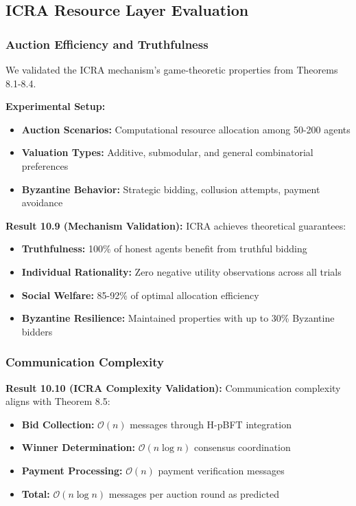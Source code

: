 \documentclass[conference]{IEEEtran}
\newcommand{\bigO}{\mathcal{O}}
\begin{document}
\subsection{ICRA Resource Layer Evaluation}

\subsubsection{Auction Efficiency and Truthfulness}

We validated the ICRA mechanism's game-theoretic properties from Theorems 8.1-8.4.

\textbf{Experimental Setup:}
\begin{itemize}
    \item \textbf{Auction Scenarios:} Computational resource allocation among 50-200 agents
    \item \textbf{Valuation Types:} Additive, submodular, and general combinatorial preferences
    \item \textbf{Byzantine Behavior:} Strategic bidding, collusion attempts, payment avoidance
\end{itemize}

\textbf{Result 10.9 (Mechanism Validation):} ICRA achieves theoretical guarantees:

\begin{itemize}
    \item \textbf{Truthfulness:} 100\% of honest agents benefit from truthful bidding
    \item \textbf{Individual Rationality:} Zero negative utility observations across all trials
    \item \textbf{Social Welfare:} 85-92\% of optimal allocation efficiency
    \item \textbf{Byzantine Resilience:} Maintained properties with up to 30\% Byzantine bidders
\end{itemize}

\subsubsection{Communication Complexity}

\textbf{Result 10.10 (ICRA Complexity Validation):} Communication complexity aligns with Theorem 8.5:

\begin{itemize}
    \item \textbf{Bid Collection:} $\bigO(n)$ messages through H-pBFT integration
    \item \textbf{Winner Determination:} $\bigO(n \log n)$ consensus coordination
    \item \textbf{Payment Processing:} $\bigO(n)$ payment verification messages
    \item \textbf{Total:} $\bigO(n \log n)$ messages per auction round as predicted
\end{itemize}
\end{document}
